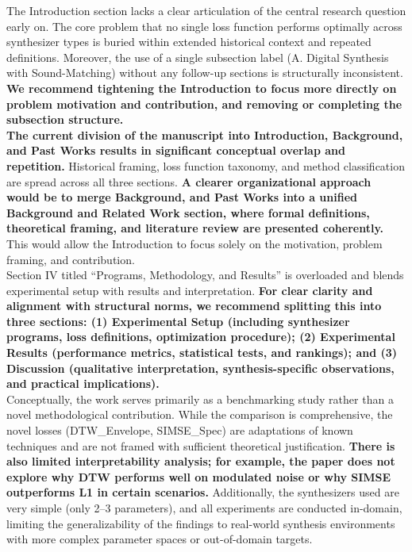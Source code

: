 \documentclass[11pt]{article}
\begin{document}
\noindent
The Introduction section lacks a clear articulation of the central research question early on. The core problem that no single loss function performs optimally across synthesizer types is buried within extended historical context and repeated definitions. Moreover, the use of a single subsection label (A. Digital Synthesis with Sound-Matching) without any follow-up sections is structurally inconsistent. \textbf{We recommend tightening the Introduction to focus more directly on problem motivation and contribution, and removing or completing the subsection structure.} \\
\textbf{The current division of the manuscript into Introduction, Background, and Past Works results in significant conceptual overlap and repetition.} Historical framing, loss function taxonomy, and method classification are spread across all three sections. \textbf{A clearer organizational approach would be to merge Background, and Past Works into a unified Background and Related Work section, where formal definitions, theoretical framing, and literature review are presented coherently.} This would allow the Introduction to focus solely on the motivation, problem framing, and contribution. \\
Section IV titled ``Programs, Methodology, and Results'' is overloaded and blends experimental setup with results and interpretation. \textbf{For clear clarity and alignment with structural norms, we recommend splitting this into three sections: (1) Experimental Setup (including synthesizer programs, loss definitions, optimization procedure); (2) Experimental Results (performance metrics, statistical tests, and rankings); and (3) Discussion (qualitative interpretation, synthesis-specific observations, and practical implications).} \\
Conceptually, the work serves primarily as a benchmarking study rather than a novel methodological contribution. While the comparison is comprehensive, the novel losses (DTW\_Envelope, SIMSE\_Spec) are adaptations of known techniques and are not framed with sufficient theoretical justification. \textbf{There is also limited interpretability analysis; for example, the paper does not explore why DTW performs well on modulated noise or why SIMSE outperforms L1 in certain scenarios.} Additionally, the synthesizers used are very simple (only 2--3 parameters), and all experiments are conducted in-domain, limiting the generalizability of the findings to real-world synthesis environments with more complex parameter spaces or out-of-domain targets. \\
\end{document}
